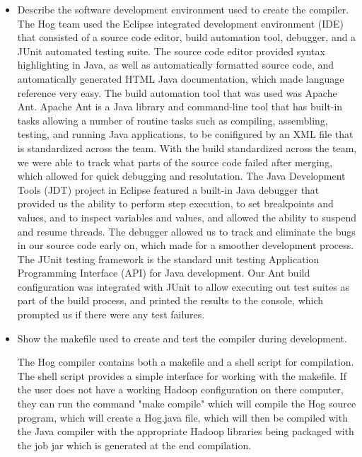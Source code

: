 \documentclass{book}
\begin{document}
\begin{itemize}
\item Describe the software development environment used to create the compiler.
	The Hog team used the Eclipse integrated development environment (IDE) that consisted of a
source code editor, build automation tool, debugger, and a  JUnit automated testing suite. The source
code editor provided syntax highlighting in Java, as well as automatically formatted source code, and automatically generated HTML Java documentation, which made language reference very easy. The 
build automation tool that was used was Apache Ant. Apache Ant is a Java library and command-line tool
that has built-in tasks allowing a number of routine tasks such as compiling, assembling, testing, and running Java applications, to be conifigured by an XML file that is standardized across the team. With the build standardized across the team, we were able to track what parts of the source code failed after merging,
which allowed for quick debugging and resolutation. The Java Development Tools (JDT) project in Eclipse featured a built-in Java debugger that provided us the ability to perform step execution, to set breakpoints and values, and to inspect variables and values, and allowed the ability to suspend and resume threads. The debugger allowed us to track and eliminate the bugs in our source code early on, which made for a smoother
development process. The JUnit testing framework is the standard unit testing Application Programming Interface (API) for Java development. Our Ant build configuration was integrated with JUnit to allow executing 
out test suites as part of the build process, and printed the results to the console, which prompted us if there
were any test failures. 


\item Show the makefile used to create and test the compiler during development.

	The Hog compiler contains both a makefile and a shell script for compilation. 
The shell script provides a simple interface for working with the makefile. If the user
does not have a working Hadoop configuration on there computer, they can run the
command "make compile" which will compile the Hog source program, which will 
create a Hog.java file, which will then be compiled with the Java compiler with the appropriate
Hadoop libraries being packaged with the job jar which is generated at the end compilation.

\begin{verbatim}


\end{verbatim}
\end{itemize}
\end{document}
